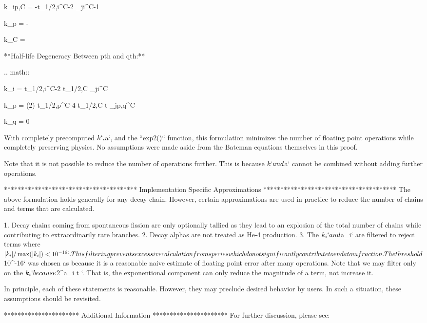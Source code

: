 \documentclass[letterpaper]{physor2018}
\begin{document}
    k_{i\ne p,C} = -\gamma t_{1/2,i}^{C-2} \prod_{j\ne i}^{C-1} 

    k_p = -\gamma

    k_C = \gamma


**Half-life Degeneracy Between pth and qth:**

.. math::

    k_i = \gamma t_{1/2,i}^{C-2} t_{1/2,C} \prod_{j\ne i}^{C} 

    k_p = \gamma\ln(2) t_{1/2,p}^{C-4} t_{1/2,C}  t \prod_{j\ne p,q}^C 

    k_q = 0

With completely precomputed $k`, $a`, and the ``exp2()`` function, this
formulation minimizes the number of floating point operations while completely
preserving physics. No assumptions were made aside from the Bateman equations
themselves in this proof.

Note that it is not possible to reduce the number of operations further.  This
is because  $k` and $a` cannot be combined without adding further
operations.

***************************************
Implementation Specific Approximations
***************************************
The above formulation holds generally for any decay chain.  However, certain
approximations are used in practice to reduce the number of chains and terms
that are calculated.

1. Decay chains coming from spontaneous fission are only optionally tallied as they
   lead to an explosion of the total number of chains while contributing to
   extraordinarily rare branches.
2. Decay alphas are not treated as He-4 production.
3. The $k_i` and $a_i` are filtered to reject terms where
   $|k_i| / \max(|k_i|) < 10^{-16}`.
   This filtering prevents excessive
   calculation from species which do not significantly contribute to
   end atom fraction. The threshold $10^{-16}` was chosen as
   because it is a reasonable naive estimate of floating point error after
   many operations. Note that we may filter only on the $k_i` because
   $2^{a_i t} `.  That is, the exponentional component can only
   reduce the magnitude of a term, not increase it.

In principle, each of these statements is reasonable. However, they
may preclude desired behavior by users. In such a situation, these
assumptions should be revisited.

**********************
Additional Information
**********************
For further discussion, please see:
\end{document}
